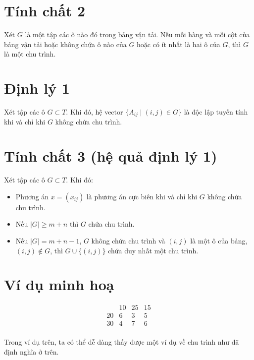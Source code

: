 \section*{Tính chất 2}

Xét $G$ là một tập các ô nào đó trong bảng vận tải. Nếu mỗi hàng và mỗi cột của bảng vận tải hoặc không chứa ô nào của $G$ hoặc có ít nhất là hai ô của $G$, thì $G$ là một chu trình.

\section*{Định lý 1}

Xét tập các ô $G \subset T$. Khi đó, hệ vector $\{A_{ij} \mid (i,j) \in G\}$ là độc lập tuyến tính khi và chỉ khi $G$ không chứa chu trình.

\section*{Tính chất 3 (hệ quả định lý 1)}

Xét tập các ô $G \subset T$. Khi đó:
\begin{itemize}
    \item Phương án $x = (x_{ij})$ là phương án cực biên khi và chỉ khi $G$ không chứa chu trình.
    \item Nếu $|G| \geq m+n$ thì $G$ chứa chu trình.
    \item Nếu $|G| = m+n -1$, $G$ không chứa chu trình và $(i, j)$ là một ô của bảng, $(i, j) \notin G$, thì $G \cup \{(i,j)\}$ chứa duy nhất một chu trình.
\end{itemize}

\section*{Ví dụ minh hoạ}

\[
\begin{array}{cccc}
 & 10 & 25 & 15 \\
20 & 6 & 3 & 5 \\
30 & 4 & 7 & 6 \\
\end{array}
\]

Trong ví dụ trên, ta có thể dễ dàng thấy được một ví dụ về chu trình như đã định nghĩa ở trên.
